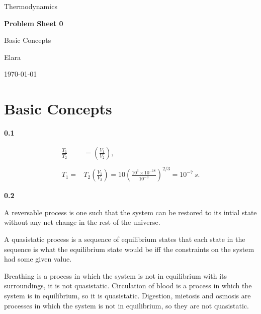\documentclass[12pt]{article}
\newcommand{\studentname}{Elara}
\newcommand{\coursename}{Thermodynamics}
\newcommand{\sheetnumber}{Problem Sheet 0}
\newcommand{\assignmenttitle}{Basic Concepts}
\newcommand{\submissiondate}{\today}
\newcommand{\problem}[2]{%
    \par\vspace{1em}
    \noindent\textbf{#1\quad #2}
    \par\smallskip
}
\begin{document}
\begin{titlepage}
    \centering

    {\large \coursename\par}

    \vfill

    {\LARGE\bfseries \sheetnumber\par}

    \vspace{1cm}

    {\large \assignmenttitle\par}

    \vspace{1cm}

    {\large \studentname\par}

    \vspace{0.5cm}

    {\large \submissiondate\par}

    \vfill
\end{titlepage}

\pagebreak

\section*{\assignmenttitle}

\problem{0.1}{}\qquad
\[
\begin{aligned}
    \frac{T_1}{T_2} &= \left(\frac{V_1}{V_2}\right),\\
    \\
    T_1 =& T_2\left(\frac{V_1}{V_2}\right)
    =10\left(\frac{10^3 \times 10^{-18}}{10^{-3}}\right)^{2/3} = 10^{-7} \, s. 
\end{aligned}
\]

\smallbreak
\problem{0.2}{} A reversable process is one such that the system can be 
restored to its intial state without any net change in the rest of the universe.

A quasistatic process is a sequence of equilibrium states that each state in the sequence is what the equilibrium state would be iff the constraints on the system had some given value.

Breathing is a process in which the system is not in equilibrium with its surroundings, it is not quasistatic.
Circulation of blood is a process in which the system is in equilibrium, so it is quasistatic.
Digestion, mietosis and osmosis are processes in which the system is not in equilibrium, so they are not quasistatic.
\end{document}
